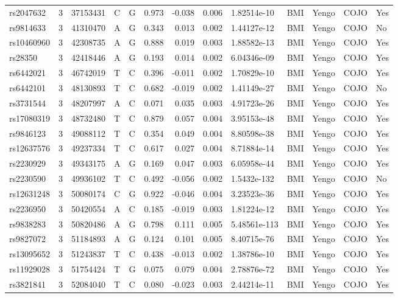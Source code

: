 \documentclass[11pt,twoside]{bristolthesis}
\begin{document}
\begin{longtable}[t]{lrlllrrrlllll}
rs2047632 & 3 & 37153431 & C & G & 0.973 & -0.038 & 0.006 & 1.82514e-10 & BMI & Yengo & COJO & Yes\\
rs9814633 & 3 & 41310470 & A & G & 0.343 & 0.013 & 0.002 & 1.44127e-12 & BMI & Yengo & COJO & No\\
rs10460960 & 3 & 42308735 & A & G & 0.888 & 0.019 & 0.003 & 1.88582e-13 & BMI & Yengo & COJO & Yes\\
\addlinespace
rs28350 & 3 & 42418446 & A & G & 0.193 & 0.014 & 0.002 & 6.04346e-09 & BMI & Yengo & COJO & Yes\\
rs6442021 & 3 & 46742019 & T & C & 0.396 & -0.011 & 0.002 & 1.70829e-10 & BMI & Yengo & COJO & Yes\\
rs6442101 & 3 & 48130893 & T & C & 0.682 & -0.019 & 0.002 & 1.41149e-27 & BMI & Yengo & COJO & No\\
rs3731544 & 3 & 48207997 & A & C & 0.071 & 0.035 & 0.003 & 4.91723e-26 & BMI & Yengo & COJO & Yes\\
rs17080319 & 3 & 48732480 & T & C & 0.879 & 0.057 & 0.004 & 3.95153e-48 & BMI & Yengo & COJO & Yes\\
\addlinespace
rs9846123 & 3 & 49088112 & T & C & 0.354 & 0.049 & 0.004 & 8.80598e-38 & BMI & Yengo & COJO & Yes\\
rs12637576 & 3 & 49237334 & T & C & 0.617 & 0.027 & 0.004 & 8.71884e-14 & BMI & Yengo & COJO & Yes\\
rs2230929 & 3 & 49343175 & A & G & 0.169 & 0.047 & 0.003 & 6.05958e-44 & BMI & Yengo & COJO & Yes\\
rs2230590 & 3 & 49936102 & T & C & 0.492 & -0.056 & 0.002 & 1.5432e-132 & BMI & Yengo & COJO & No\\
rs12631248 & 3 & 50080174 & C & G & 0.922 & -0.046 & 0.004 & 3.23523e-36 & BMI & Yengo & COJO & Yes\\
\addlinespace
rs2236950 & 3 & 50420554 & A & C & 0.185 & -0.019 & 0.003 & 1.81224e-12 & BMI & Yengo & COJO & Yes\\
rs9838283 & 3 & 50820486 & A & G & 0.798 & 0.111 & 0.005 & 5.48561e-113 & BMI & Yengo & COJO & Yes\\
rs9827072 & 3 & 51184893 & A & G & 0.124 & 0.101 & 0.005 & 8.40715e-76 & BMI & Yengo & COJO & Yes\\
rs13095652 & 3 & 51243837 & T & C & 0.438 & -0.013 & 0.002 & 1.38786e-10 & BMI & Yengo & COJO & Yes\\
rs11929028 & 3 & 51754424 & T & G & 0.075 & 0.079 & 0.004 & 2.78876e-72 & BMI & Yengo & COJO & Yes\\
\addlinespace
rs3821841 & 3 & 52084040 & T & C & 0.080 & -0.023 & 0.003 & 2.44214e-11 & BMI & Yengo & COJO & Yes\\

\end{longtable}
\end{document}
